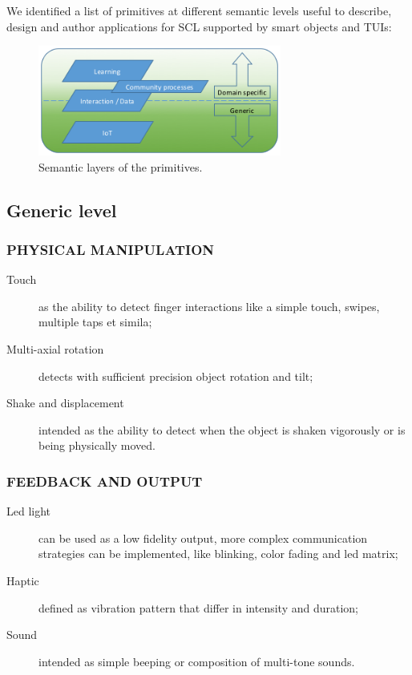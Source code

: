 We identified a list of primitives at different semantic levels useful to describe, design and author applications for SCL supported by smart objects and TUIs:

\begin{figure}[htb]
\centering
\includegraphics[width=8cm]{img/primitive_layers}
\caption{Semantic layers of the primitives.}
\label{fig:layers}
\end{figure}


\subsection{Generic level}
\medskip

\subsubsection{PHYSICAL MANIPULATION}
\begin{description}
\item [Touch] as the ability to detect finger interactions like a simple touch, swipes, multiple taps et simila;
\item [Multi-axial rotation] detects with sufficient precision object rotation and tilt;
\item [Shake and displacement] intended as the ability to detect when the object is shaken vigorously or is being physically moved.
\end{description}

\subsubsection{FEEDBACK AND OUTPUT}
\begin{description}
\item [Led light] can be used as a low fidelity output, more complex communication strategies can be implemented, like blinking, color fading and led matrix;
\item [Haptic] defined as vibration pattern that differ in intensity and duration;
\item [Sound] intended as simple beeping or composition of multi-tone sounds.
\end{description}

